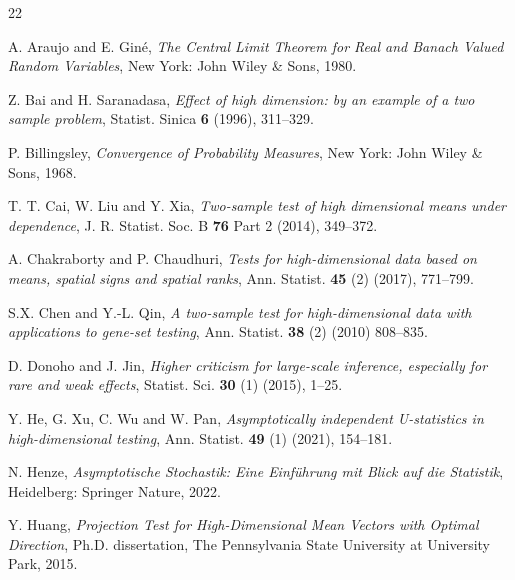 \documentclass[sn-mathphys,Numbered]{sn-jnl}%
\theoremstyle{thmstyleone}%
\theoremstyle{thmstyletwo}%
\theoremstyle{thmstylethree}%
\begin{document}






\begin{thebibliography}{22}

 A. Araujo and E. Gin\'{e}, \textit{The Central Limit Theorem for Real and Banach Valued Random Variables}, New York: John Wiley \& Sons, 1980.

 Z. Bai and H. Saranadasa, \textit{Effect of high dimension: by an example of a two sample problem}, Statist. Sinica \textbf{6} (1996), 311--329.

 P. Billingsley, \textit{Convergence of Probability Measures}, New York: John Wiley \& Sons, 1968.

 T. T. Cai, W. Liu and Y. Xia, \textit{Two-sample test of high dimensional means under dependence}, J. R. Statist. Soc. B \textbf{76} Part 2 (2014), 349--372.

 A. Chakraborty and P. Chaudhuri, \textit{Tests for high-dimensional data based on means, spatial signs and spatial ranks}, Ann. Statist. \textbf{45} (2) (2017), 771--799.

 S.X. Chen and Y.-L. Qin, \textit{A two-sample test for high-dimensional data with applications to gene-set testing}, Ann. Statist. \textbf{38} (2) (2010) 808--835.

 D. Donoho and J. Jin, \textit{Higher criticism for large-scale inference, especially for rare and weak effects}, Statist. Sci. \textbf{30} (1) (2015), 1--25.

 Y. He, G. Xu, C. Wu and W. Pan, \textit{Asymptotically independent U-statistics in high-dimensional testing}, Ann. Statist. \textbf{49} (1) (2021), 154--181.

 N. Henze, \textit{Asymptotische Stochastik: Eine Einf\"{u}hrung mit Blick auf die Statistik}, Heidelberg: Springer Nature, 2022.

 Y. Huang, \textit{Projection Test for High-Dimensional Mean Vectors with Optimal Direction}, Ph.D. dissertation, The Pennsylvania State University at University Park, 2015.


\end{thebibliography}
\end{document}
